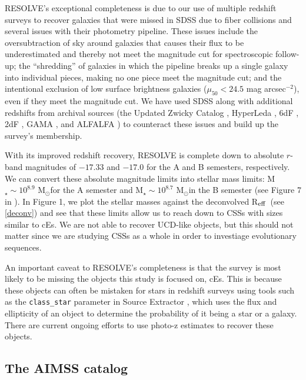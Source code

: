 \documentclass[iop,apj,twocolappendix]{emulateapj}
\newcommand{\Reff}{R$_{\rm eff}$}
\newcommand{\Msun}{M$_{\odot}$}
\begin{document}
RESOLVE's exceptional completeness is due to our use of multiple redshift surveys to recover galaxies that were missed in SDSS due to fiber collisions and several issues with their photometry pipeline. These issues include the oversubtraction of sky around galaxies that causes their flux to be underestimated and thereby not meet the magnitude cut for spectroscopic follow-up; the ``shredding'' of galaxies in which the pipeline breaks up a single galaxy into individual pieces, making no one piece meet the magnitude cut; and the intentional exclusion of low surface brightness galaxies ($\mu_{50} < 24.5$ mag arcsec$^{-2}$), even if they meet the magnitude cut. We have used SDSS along with additional redshifts from archival sources (the Updated Zwicky Catalog \citep{Falco1999}, HyperLeda \citep{Paturel2003}, 6dF \citep{Jones2009}, 2dF \citep{Colless2001}, GAMA \citep{Driver2011}, and ALFALFA \citep{Haynes2011}) to counteract these issues and build up the survey's membership.

With its improved redshift recovery, RESOLVE is complete down to absolute $r$-band magnitudes of $-17.33$ and $-17.0$ for the A and B semesters, respectively. We can convert these absolute magnitude limits into stellar mass limits: M$_{\star} \sim 10^{8.9}$ \Msun for the A semester and M$_{\star} \sim 10^{8.7}$ \Msun in the B semester (see Figure 7 in \citet{Eckert2015B}). In Figure 1, we plot the stellar masses against the deconvolved \Reff\ (see \autoref{deconv}) and see that these limits allow us to reach down to CSSs with sizes similar to cEs. We are not able to recover UCD-like objects, but this should not matter since we are studying CSSs as a whole in order to investiage evolutionary sequences.

An important caveat to RESOLVE's completeness is that the survey is most likely to be missing the objects this study is focused on, cEs. This is because these objects can often be mistaken for stars in redshift surveys using tools such as the \texttt{class\_star} parameter in Source Extractor \citep{Bertin1996}, which uses the flux and ellipticity of an object to determine the probability of it being a star or a galaxy. There are current ongoing efforts to use photo-z estimates to recover these objects.

\subsection{The AIMSS catalog}
\label{aimss}
\end{document}
